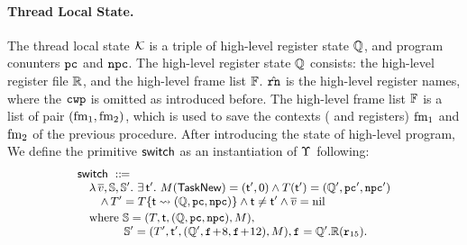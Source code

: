 \paragraph{\textbf{Thread Local State.}} 
The thread local state $\mathcal{K}$ 
is a triple of high-level register state $\mathbb{Q}$, 
and program conunters $\texttt{pc}$ and $\texttt{npc}$. The high-level 
register state $\mathbb{Q}$ consists: 
the high-level register file $\mathbb{R}$, 
and the high-level frame list $\mathbb{F}$. 
$\hat{\texttt{rn}}$ is the high-level register names, where 
the $\texttt{cwp}$ is omitted as introduced before.
The high-level frame list $\mathbb{F}$ is a list of pair 
$(\text{fm}_1, \text{fm}_2)$, which is used to save 
the contexts (\localRN{} and \inRN{} registers) 
$\text{fm}_1$ and $\text{fm}_2$ of the previous procedure.
After introducing the state of high-level program, 
We define the primitive $\mathsf{switch}$ as 
an instantiation of $\Upsilon$ following: 
\[
    \small
    \begin{array}{l}
        \primsw \ \define \\
        \quad 
        \lambda \, \args{\val}, \hpstate, \hpstate'. \ 
        \exists \, \thrdid'. \ 
        \Mem(\TaskNew) = (\thrdid', 0) \land 
        \thrdpool(\thrdid') = 
            (\hRstate', \pc', \npc') \\
        \qquad
        \land \,
        \thrdpool' = \thrdpool\{ \thrdid \rightsquigarrow 
            (\hRstate, \pc, \npc) \} 
            \land \tid \neq \tid' \land \args{\val} = \nil \\
        \\[-9pt]
        \quad \text{where} \ 
        \hpstate = 
            (\thrdpool, \thrdid, (\hRstate, \pc, \npc), \Mem), \\
        \qquad\qquad
        \hpstate' = 
            (\thrdpool', \thrdid', 
                (\hRstate', \lab{}\!+\!8, \lab{}\!+\!12), \Mem), 
                \lab{} = \hRstate'.\hRfile(\reg{15}). 
    \end{array}
\]
